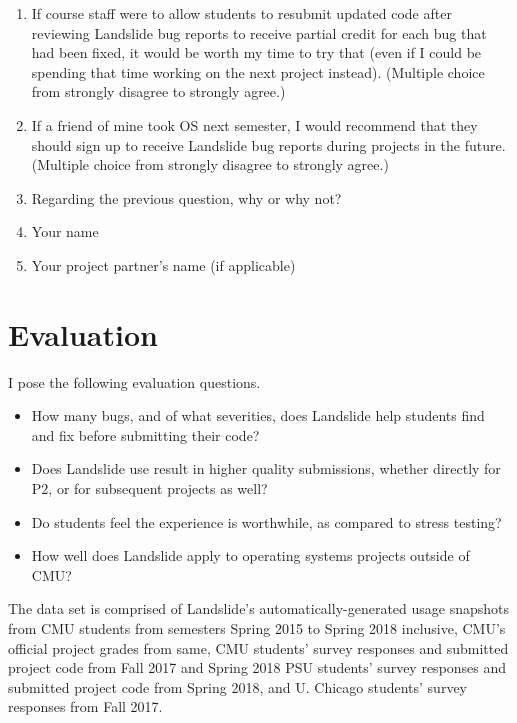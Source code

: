 \begin{enumerate}
	\item If course staff were to allow students to resubmit updated code after reviewing Landslide bug reports to receive partial credit for each bug that had been fixed, it would be worth my time to try that (even if I could be spending that time working on the next project instead).
		(Multiple choice from strongly disagree to strongly agree.)
	\item If a friend of mine took OS next semester, I would recommend that they should sign up to receive Landslide bug reports during projects in the future.
		(Multiple choice from strongly disagree to strongly agree.)
	\item Regarding the previous question, why or why not?
	\item Your name
	\item Your project partner's name (if applicable)
\end{enumerate}


\section{Evaluation}

I pose the following evaluation questions.

\begin{itemize}
	\item How many bugs, and of what severities, does Landslide help students find and fix before submitting their code?
	\item Does Landslide use result in higher quality submissions, whether directly for P2, or for subsequent projects as well?
	\item Do students feel the experience is worthwhile, as compared to stress testing?
	\item How well does Landslide apply to operating systems projects outside of CMU?
\end{itemize}
\vspace{1em}

The data set is comprised of Landslide's automatically-generated usage snapshots
from CMU students from semesters Spring 2015 to Spring 2018 inclusive,
CMU's official project grades from same,
CMU students' survey responses and submitted project code from Fall 2017 and Spring 2018
PSU students' survey responses and submitted project code from Spring 2018,
and U. Chicago students' survey responses from Fall 2017.

